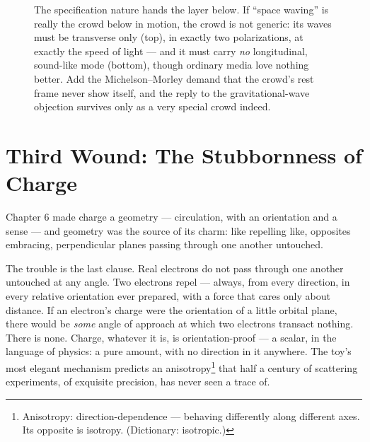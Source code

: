 \documentclass[fontsize=11pt,paper=a4,pagesize=auto,parskip=half-]{scrbook}
\begin{document}
\begin{figure}[htbp]
\centering
{}
\caption{The specification nature hands the layer below. If ``space waving'' is really the crowd below in motion, the crowd is not generic: its waves must be transverse only (top), in exactly two polarizations, at exactly the speed of light --- and it must carry \emph{no} longitudinal, sound-like mode (bottom), though ordinary media love nothing better. Add the Michelson--Morley demand that the crowd's rest frame never show itself, and the reply to the gravitational-wave objection survives only as a very special crowd indeed.}
\label{fig:wavemodes}
\end{figure}

\section{Third Wound: The Stubbornness of Charge}

Chapter 6 made charge a geometry --- circulation, with an orientation and a sense --- and geometry was the source of its charm: like repelling like, opposites embracing, perpendicular planes passing through one another untouched.

The trouble is the last clause. Real electrons do not pass through one another untouched at any angle. Two electrons repel --- always, from every direction, in every relative orientation ever prepared, with a force that cares only about distance. If an electron's charge were the orientation of a little orbital plane, there would be \emph{some} angle of approach at which two electrons transact nothing. There is none. Charge, whatever it is, is orientation-proof --- a scalar, in the language of physics: a pure amount, with no direction in it anywhere. The toy's most elegant mechanism predicts an anisotropy\footnote{Anisotropy: direction-dependence --- behaving differently along different axes. Its opposite is isotropy. (Dictionary: isotropic.)} that half a century of scattering experiments, of exquisite precision, has never seen a trace of.
\end{document}
